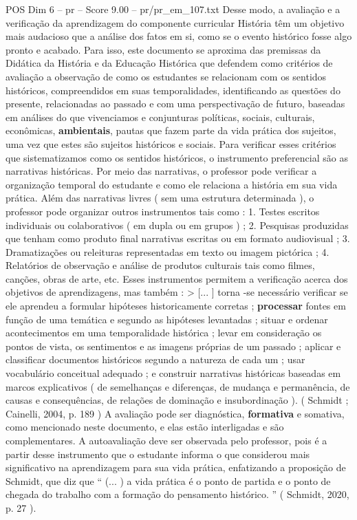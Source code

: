 \begin{textsample}{POS Dim 6 – pr – Score 9.00 – pr/pr\_em\_107.txt}
Desse modo, a avaliação e a verificação da aprendizagem do componente curricular História têm um objetivo mais audacioso que a análise dos fatos em si, como se o evento histórico fosse algo pronto e acabado.
Para isso, este documento se aproxima das premissas da Didática da História e da Educação Histórica que defendem como critérios de avaliação a observação de como os estudantes se relacionam com os sentidos históricos, compreendidos em suas temporalidades, identificando as questões do presente, relacionadas ao passado e com uma perspectivação de futuro, baseadas em análises do que vivenciamos e conjunturas políticas, sociais, culturais, econômicas, \textbf{ambientais}, pautas que fazem parte da vida prática dos sujeitos, uma vez que estes são sujeitos históricos e sociais.
Para verificar esses critérios que sistematizamos como os sentidos históricos, o instrumento preferencial são as narrativas históricas.
Por meio das narrativas, o professor pode verificar a organização temporal do estudante e como ele relaciona a história em sua vida prática.
Além das narrativas livres ( sem uma estrutura determinada ), o professor pode organizar outros instrumentos tais como : 1.
Testes escritos individuais ou colaborativos ( em dupla ou em grupos ) ; 2.
Pesquisas produzidas que tenham como produto final narrativas escritas ou em formato audiovisual ; 3.
Dramatizações ou releituras representadas em texto ou imagem pictórica ; 4.
Relatórios de observação e análise de produtos culturais tais como filmes, canções, obras de arte, etc.
Esses instrumentos permitem a verificação acerca dos objetivos de aprendizagens, mas também : > [... ] torna -se necessário verificar se ele aprendeu a formular hipóteses historicamente corretas ; \textbf{processar} fontes em função de uma temática e segundo as hipóteses levantadas ; situar e ordenar acontecimentos em uma temporalidade histórica ; levar em consideração os pontos de vista, os sentimentos e as imagens próprias de um passado ; aplicar e classificar documentos históricos segundo a natureza de cada um ; usar vocabulário conceitual adequado ; e construir narrativas históricas baseadas em marcos explicativos ( de semelhanças e diferenças, de mudança e permanência, de causas e consequências, de relações de dominação e insubordinação ). ( Schmidt ; Cainelli, 2004, p. 189 ) A avaliação pode ser diagnóstica, \textbf{formativa} e somativa, como mencionado neste documento, e elas estão interligadas e são complementares.
A autoavaliação deve ser observada pelo professor, pois é a partir desse instrumento que o estudante informa o que considerou mais significativo na aprendizagem para sua vida prática, enfatizando a proposição de Schmidt, que diz que “ (... ) a vida prática é o ponto de partida e o ponto de chegada do trabalho com a formação do pensamento histórico. ” ( Schmidt, 2020, p. 27 ).

\end{textsample}
